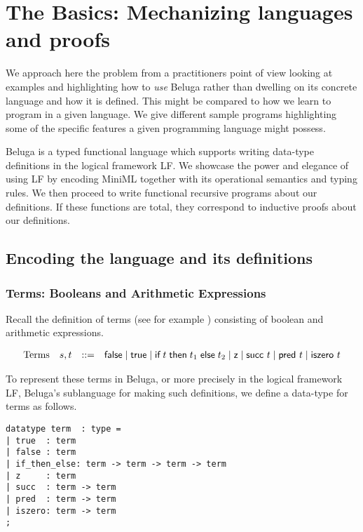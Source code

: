 \chapter{The Basics: Mechanizing languages and proofs}
We approach here the problem from a practitioners point of view looking at
examples and highlighting how to \emph{use} Beluga rather than dwelling on its
concrete language and how it is defined. This might be compared to how we learn to program in a
given language. We give different sample programs highlighting some of the
specific features a given programming language might possess. 

Beluga is a typed functional language which supports writing data-type
definitions in the logical framework LF. We showcase the
power and elegance of using LF by encoding MiniML together with its operational
semantics and typing rules. We then proceed to write functional recursive
programs about our definitions. If these functions are total, they correspond to
inductive proofs about our definitions.

\section{Encoding the language and its definitions}
\subsection{Terms: Booleans and Arithmetic Expressions}
Recall the definition of terms (see for example \cite[Ch 3, Fig 3-2]{TAPL})
consisting of boolean and arithmetic expressions.

\[
\begin{array}{llcl}
\mbox{Terms} & s,t & \mathrel{::=} & \textsf{false} \mid \textsf{true} \mid \textsf{if\;} t \textsf{\;then\;} t_1 \textsf{\;else\;} t_2 \mid
\textsf{z} \mid \textsf{succ}~t \mid \textsf{pred}~t \mid \textsf{iszero}~t
\end{array}
\]

To represent these terms in Beluga, or more precisely in the logical framework
LF, Beluga's sublanguage for making such definitions, we define a data-type for terms as follows.

\begin{lstlisting}
datatype term  : type = 
| true  : term
| false : term
| if_then_else: term -> term -> term -> term
| z     : term
| succ  : term -> term
| pred  : term -> term
| iszero: term -> term
;
\end{lstlisting}

